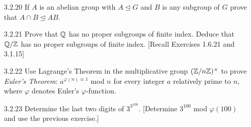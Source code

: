 \begin{enumerate}
   \item[3.2.20]  If $A$ is an abelian group with $A \trianglelefteq G$ and $B$
                  is any subgroup of $G$ prove that
                  $A \cap B \trianglelefteq AB$.
   \item[3.2.21]  Prove that $\mathbb{Q}$ has no proper subgroups of finite index.
                  Deduce that $\mathbb{Q}/\mathbb{Z}$ has no proper subgroups of finite index.
                  [Recall Exercises 1.6.21 and 3.1.15]
   \item[3.2.22]  Use Lagrange's Theorem in the multiplicative group
                  $(\mathbb{Z}/n\mathbb{Z})^\times$ to prove \textit{Euler's Theorem}:
                  $a^{\varphi(n) \equiv 1}$ mod $n$ for every integer $a$
                  relatively prime to $n$, where $\varphi$ denotes Euler's
                  $\varphi$-function.
   \item[3.2.23]  Determine the last two digits of $3^{3^{100}}$. [Determine
                  $3^{100}$ mod $\varphi(100)$ and use the previous exercise.]
\end{enumerate}
